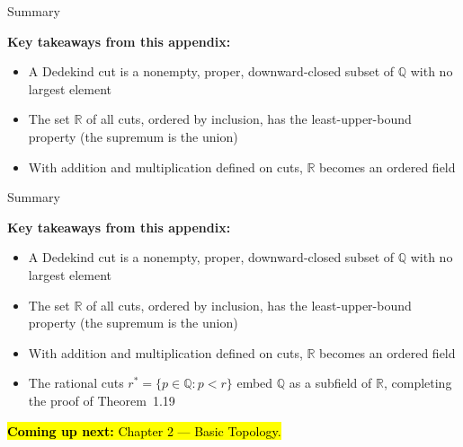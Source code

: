 \documentclass[aspectratio=169,12pt,t]{beamer}
\begin{document}
{%
\begin{frame}{Summary}
  \begin{hlbox}
    \textbf{Key takeaways from this appendix:}
    \begin{itemize}
      \item A \alert{Dedekind cut} is a nonempty, proper, downward-closed subset
            of $\mathbb{Q}$ with no largest element
      \item The set $\mathbb{R}$ of all cuts, ordered by inclusion, has the
            \alert{least-upper-bound property} (the supremum is the union)
      \item With addition and multiplication defined on cuts, $\mathbb{R}$ becomes an
            \alert{ordered field}
    \end{itemize}
  \end{hlbox}

\end{frame}

\begin{frame}{Summary}
  \begin{hlbox}
    \textbf{Key takeaways from this appendix:}
    \begin{itemize}
      \item A \alert{Dedekind cut} is a nonempty, proper, downward-closed subset
            of $\mathbb{Q}$ with no largest element
      \item The set $\mathbb{R}$ of all cuts, ordered by inclusion, has the
            \alert{least-upper-bound property} (the supremum is the union)
      \item With addition and multiplication defined on cuts, $\mathbb{R}$ becomes an
            \alert{ordered field}
      \item The rational cuts $r^* = \{p \in \mathbb{Q} : p < r\}$ embed
            $\mathbb{Q}$ as a subfield of $\mathbb{R}$, completing the proof of
            Theorem~1.19
    \end{itemize}
  \end{hlbox}

  \vspace{0.5em}
  \hl{\textbf{Coming up next:} Chapter 2 --- Basic Topology.}

\end{frame}
}
\end{document}
